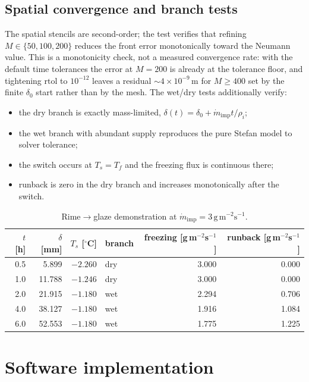 \documentclass[11pt,a4paper]{article}
\newcommand{\Ts}{T_s}
\newcommand{\Tf}{T_f}
\newcommand{\mdot}{\dot m}
\begin{document}
\subsection{Spatial convergence and branch tests}

The spatial stencils are second-order; the test verifies that refining
$M\in\{50,100,200\}$ reduces the front error monotonically toward the Neumann value.
This is a monotonicity check, not a measured convergence rate: with the default time
tolerances the error at $M=200$ is already at the tolerance floor, and tightening
$\mathrm{rtol}$ to $10^{-12}$ leaves a residual $\sim4\times10^{-9}\,\mathrm{m}$ for
$M\ge400$ set by the finite $\delta_0$ start rather than by the mesh. The wet/dry tests
additionally verify:
\begin{itemize}[leftmargin=1.4em,itemsep=2pt]
  \item the dry branch is exactly mass-limited, $\delta(t)=\delta_0+\mdot_{\mathrm{imp}}t/\rho_i$;
  \item the wet branch with abundant supply reproduces the pure Stefan model to solver tolerance;
  \item the switch occurs at $\Ts=\Tf$ and the freezing flux is continuous there;
  \item runback is zero in the dry branch and increases monotonically after the switch.
\end{itemize}

\begin{table}[htbp]
\centering
\caption{Rime$\to$glaze demonstration at $\mdot_{\mathrm{imp}}=3\,\mathrm{g\,m^{-2}s^{-1}}$.}
\label{tab:wetdry}
\begin{tabular}{rrrlrr}
\toprule
$t$ [h] & $\delta$ [mm] & $\Ts$ [$^\circ$C] & branch &
freezing [g\,m$^{-2}$s$^{-1}$] & runback [g\,m$^{-2}$s$^{-1}$]\\
\midrule
0.5 &  5.899 & $-2.260$ & dry & 3.000 & 0.000 \\
1.0 & 11.788 & $-1.246$ & dry & 3.000 & 0.000 \\
2.0 & 21.915 & $-1.180$ & wet & 2.294 & 0.706 \\
4.0 & 38.127 & $-1.180$ & wet & 1.916 & 1.084 \\
6.0 & 52.553 & $-1.180$ & wet & 1.775 & 1.225 \\
\bottomrule
\end{tabular}
\end{table}

\section{Software implementation}\label{sec:software}
\end{document}
